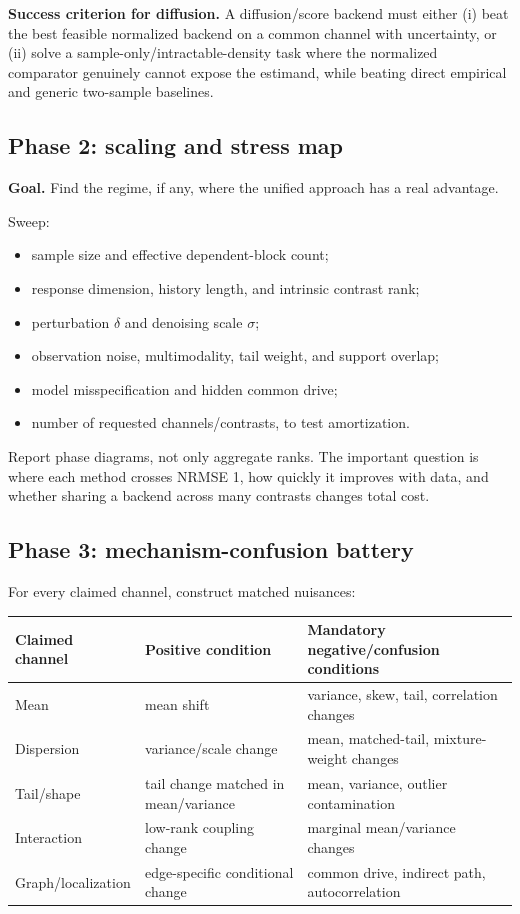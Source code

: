\documentclass[10pt]{article}
\begin{document}
\textbf{Success criterion for diffusion.} A diffusion/score backend must either (i) beat the best feasible normalized backend on a common channel with uncertainty, or (ii) solve a sample-only/intractable-density task where the normalized comparator genuinely cannot expose the estimand, while beating direct empirical and generic two-sample baselines.

\subsection{Phase 2: scaling and stress map}

\textbf{Goal.} Find the regime, if any, where the unified approach has a real advantage.

Sweep:

\begin{itemize}
  \item sample size and effective dependent-block count;
  \item response dimension, history length, and intrinsic contrast rank;
  \item perturbation \(\delta\) and denoising scale \(\sigma\);
  \item observation noise, multimodality, tail weight, and support overlap;
  \item model misspecification and hidden common drive;
  \item number of requested channels/contrasts, to test amortization.
\end{itemize}

Report phase diagrams, not only aggregate ranks. The important question is where each method crosses NRMSE 1, how quickly it improves with data, and whether sharing a backend across many contrasts changes total cost.

\subsection{Phase 3: mechanism-confusion battery}

For every claimed channel, construct matched nuisances:

\begin{center}
\begin{tabular}{@{}lll@{}}
\toprule
Claimed channel & Positive condition & Mandatory negative/confusion conditions \\
\midrule
Mean & mean shift & variance, skew, tail, correlation changes \\
Dispersion & variance/scale change & mean, matched-tail, mixture-weight changes \\
Tail/shape & tail change matched in mean/variance & mean, variance, outlier contamination \\
Interaction & low-rank coupling change & marginal mean/variance changes \\
Graph/localization & edge-specific conditional change & common drive, indirect path, autocorrelation \\
\bottomrule
\end{tabular}
\end{center}
\end{document}
